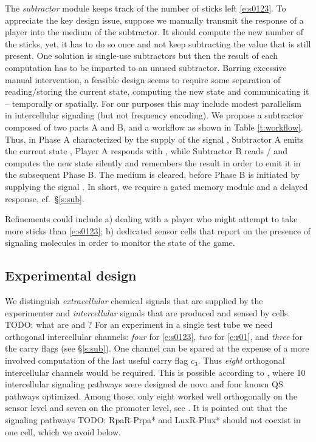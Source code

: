 \documentclass[12pt,notitlepage]{article}
\newcommand{\TODO}[1]{\textrm{\color{red}TODO: #1}}
\begin{document}
The \emph{subtractor} module
keeps track of the number of sticks left \eqref{e:s0123}.
To appreciate the key design issue, suppose
we manually transmit the response 
of a player
into the medium of the subtractor.
It should compute the new number of the sticks,
yet, it has to do so once
and not keep subtracting the value 
that is still present.
One solution is single-use subtractors
but then the result of each computation
has to be imparted to an unused subtractor.
Barring excessive manual intervention,
a feasible design
seems to require some separation of
reading/storing the current state,
computing the new state and communicating it
--
temporally or spatially.
For our purposes
this may include
modest parallelism in intercellular signaling
(but not frequency encoding).
%
%
We propose 
a subtractor composed of two parts A and B,
and
a workflow 
as shown in Table \ref{t:workflow}.
%
%
%
Thus,
in Phase A characterized by the supply of 
the signal ,
Subtractor A
emits the current state ,
Player A responds with ,
while
Subtractor B
reads /
and
computes the new state %
{silently}
and remembers the result
in order to emit it in the subsequent Phase B.
%
The medium is cleared, before
Phase B is initiated by
supplying the signal .
%
%
In short,
we require
a gated memory module and a delayed response,
cf.~\S\ref{s:sub}.

%

Refinements could include
a)
dealing with
a player who might attempt
to take more sticks than \eqref{e:s0123};
b)
dedicated sensor cells 
that report 
on the presence of signaling molecules 
in order to 
monitor the state of the game.

%




\subsection{Experimental design}
\label{ss:experiment}

We distinguish
\emph{extracellular} chemical signals 
that are supplied by the experimenter
and
\emph{intercellular} signals
that are produced and sensed by cells.
%
\TODO{what are  and ?}
%
%
For an experiment in a single test tube 
we need
orthogonal intercellular channels:
\emph{four} for \eqref{e:s0123},
\emph{two} for \eqref{e:r01},
and
\emph{three} for the carry flags
(see \S\ref{s:sub}).
%
One channel can be spared 
at the expense
of a more involved computation of 
the last useful carry flag $c_3$.
%
Thus \emph{eight} orthogonal intercellular channels
would be required.
%
This is possible according to \cite{DuETAL2020},
where 10 intercellular signaling
pathways were designed de novo
and
four known QS pathways optimized.
%
Among those, only eight worked well orthogonally
on the sensor level 
and 
seven on the promoter level,
see
\cite[\href{https://www.nature.com/articles/s41467-020-17993-w/figures/3}{Fig.~3c/g}]{DuETAL2020}.
%
It is pointed out
\cite[p.6]{DuETAL2020}
that 
the signaling pathways 
\TODO{RpaR-Prpa* and LuxR-Plux*}
should not coexist in one cell,
which we avoid below.
%
\end{document}
